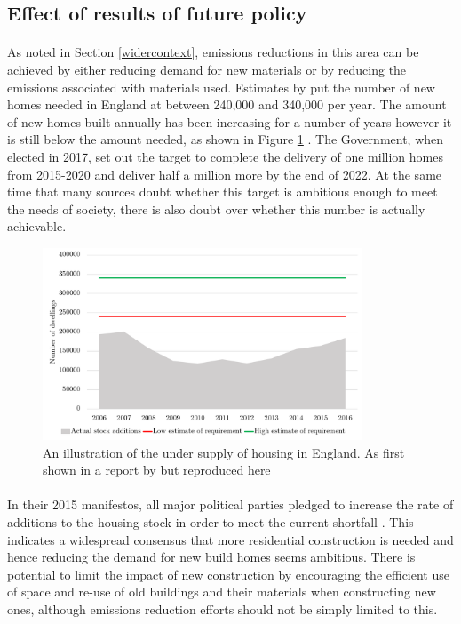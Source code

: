 \documentclass[12pt]{article}
\begin{document}
\subsection{Effect of results of future policy}

\paragraph{}
As noted in Section \ref{widercontext}, emissions reductions in this area can be achieved by either reducing demand for new materials or by reducing the emissions associated with materials used. Estimates by \citet{Wilson2018-ug} put the number of new homes needed in England at between 240,000 and 340,000 per year. The amount of new homes built annually has been increasing for a number of years however it is still below the amount needed, as shown in Figure \ref{fig:stockadditions} \citep{Ministry_of_Housing_Communities2012-zw, Wilson2018-ug}. The Government, when elected in 2017, set out the target to complete the delivery of one million homes from 2015-2020 and deliver half a million more by the end of 2022. At the same time that many sources doubt whether this target is ambitious enough to meet the needs of society, there is also doubt over whether this number is actually achievable.

\begin{figure}[ht!]
    \centering
    \includegraphics[width=0.85\textwidth]{Figures/Undersupply.png}
    \caption{An illustration of the under supply of housing in England. As first shown in a report by \citet{Wilson2018-ug} but reproduced here}
    \label{fig:stockadditions}
\end{figure}

\paragraph{}
In their 2015 manifestos, all major political parties pledged to increase the rate of additions to the housing stock in order to meet the current shortfall \citep{Wilson2018-ug}. This indicates a widespread consensus that more residential construction is needed and hence reducing the demand for new build homes seems ambitious. There is potential to limit the impact of new construction by encouraging the efficient use of space and re-use of old buildings and their materials when constructing new ones, although emissions reduction efforts should not be simply limited to this.
\end{document}
